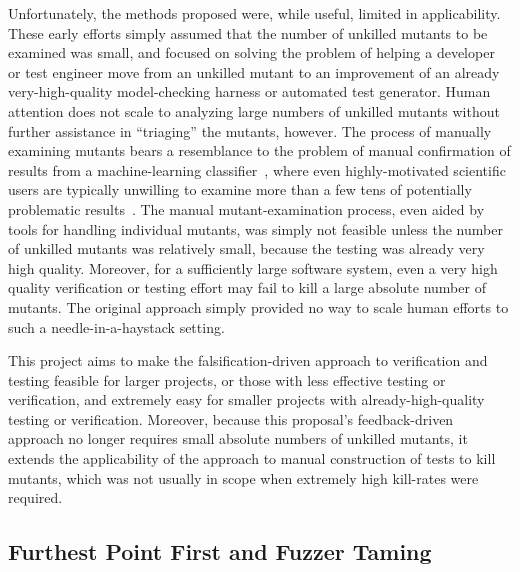 Unfortunately, the
methods proposed were, while useful, limited in applicability.  These
early efforts simply assumed that the number of unkilled mutants to be examined was
small, and focused on solving the problem of helping a developer or
test engineer move from an unkilled mutant to an improvement of an
already very-high-quality
model-checking harness or  automated test generator.  Human
attention does not scale to analyzing large numbers of 
unkilled
mutants without further assistance in ``triaging'' the mutants,
however.  The process of manually examining mutants bears a
resemblance to the problem of manual confirmation of results from a
machine-learning classifier~\cite{OnlyOracle,EndUserMistake}, where even highly-motivated scientific
users are typically unwilling to examine more than a few tens of
potentially problematic results~\cite{Segal}.
The manual mutant-examination process, even aided by
tools for handling individual mutants, was simply not feasible unless the number of
unkilled mutants was relatively small, because the testing was already
very high quality.  Moreover, for a sufficiently large software system, even a
very high quality verification or testing effort may fail to kill a
large absolute number of mutants.  The original approach simply provided no way to
scale human efforts to such a needle-in-a-haystack setting. 

This project aims to make the falsification-driven approach to verification and testing feasible for larger
projects, or those with less effective testing or verification, and extremely easy for
smaller projects with already-high-quality testing or verification.
Moreover, because this proposal's feedback-driven approach no longer requires small absolute numbers of
unkilled mutants, it extends the applicability of the approach
to manual construction of tests to kill mutants, which was not usually in
scope when extremely high kill-rates were required.

\subsection{Furthest Point First and Fuzzer Taming}

